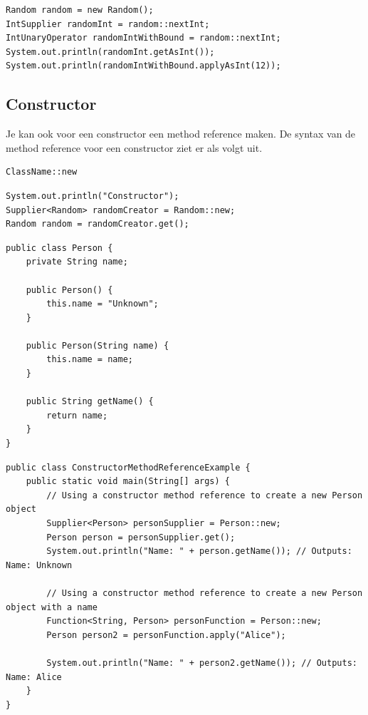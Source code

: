 \begin{lstlisting}
Random random = new Random();
IntSupplier randomInt = random::nextInt;
IntUnaryOperator randomIntWithBound = random::nextInt;
System.out.println(randomInt.getAsInt());
System.out.println(randomIntWithBound.applyAsInt(12));
\end{lstlisting}

\subsection{Constructor}

Je kan ook voor een constructor een method reference maken. De syntax van de method reference voor een constructor ziet er als volgt uit.

\begin{verbatim}
ClassName::new
\end{verbatim}

\begin{lstlisting}
System.out.println("Constructor");
Supplier<Random> randomCreator = Random::new;
Random random = randomCreator.get();
\end{lstlisting}

\begin{lstlisting}
public class Person {
    private String name;

    public Person() {
        this.name = "Unknown";
    }

    public Person(String name) {
        this.name = name;
    }

    public String getName() {
        return name;
    }
}
\end{lstlisting}

\begin{lstlisting}
public class ConstructorMethodReferenceExample {
    public static void main(String[] args) {
        // Using a constructor method reference to create a new Person object
        Supplier<Person> personSupplier = Person::new;
        Person person = personSupplier.get();
        System.out.println("Name: " + person.getName()); // Outputs: Name: Unknown
   
        // Using a constructor method reference to create a new Person object with a name
        Function<String, Person> personFunction = Person::new;
        Person person2 = personFunction.apply("Alice");

        System.out.println("Name: " + person2.getName()); // Outputs: Name: Alice
    }
}
\end{lstlisting}

